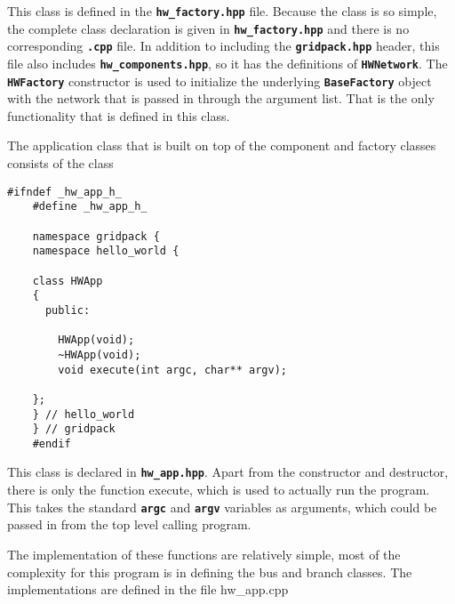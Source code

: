 This class is defined in the \texttt{\textbf{hw\_factory.hpp}} file. Because the class is so simple, the complete class declaration is given in \texttt{\textbf{hw\_factory.hpp}} and there is no corresponding \texttt{\textbf{.cpp}} file. In addition to including the \texttt{\textbf{gridpack.hpp}} header, this file also includes \texttt{\textbf{hw\_components.hpp}}, so it has the definitions of \texttt{\textbf{HWNetwork}}. The \texttt{\textbf{HWFactory}} constructor is used to initialize the underlying \texttt{\textbf{BaseFactory}} object with the network that is passed in through the argument list. That is the only functionality that is defined in this class.

The application class that is built on top of the component and factory classes consists of the class

{
\color{red}
\begin{Verbatim}[fontseries=b]
    #ifndef _hw_app_h_
    #define _hw_app_h_

    namespace gridpack {
    namespace hello_world {

    class HWApp
    {
      public:

        HWApp(void);
        ~HWApp(void);
        void execute(int argc, char** argv);

    };
    } // hello_world
    } // gridpack
    #endif
\end{Verbatim}
}

This class is declared in \texttt{\textbf{hw\_app.hpp}}. Apart from the constructor and destructor, there is only the function execute, which is used to actually run the program. This takes the standard \texttt{\textbf{argc}} and \texttt{\textbf{argv}} variables as arguments, which could be passed in from the top level calling program.

The implementation of these functions are relatively simple, most of the complexity for this program is in defining the bus and branch classes. The implementations are defined in the file hw\_app.cpp

